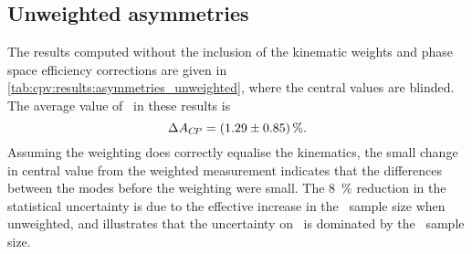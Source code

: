 \subsection{Unweighted asymmetries}

The results computed without the inclusion of the kinematic weights and phase 
space efficiency corrections are given in 
\cref{tab:cpv:results:asymmetries_unweighted}, where the central values are 
blinded.
The average value of \dACP\ in these results is
\begin{equation*}
  \dACP = \deltaACPUnweighted.
\end{equation*}
Assuming the weighting does correctly equalise the kinematics, the small change 
in central value from the weighted measurement indicates that the differences 
between the modes before the weighting were small.
The \SI{8}{\percent} reduction in the statistical uncertainty is due to the 
effective increase in the \ppipi\ sample size when unweighted, and illustrates 
that the uncertainty on \dACP\ is dominated by the \pKK\ sample size.

\begin{table}
  \centering
  \caption{%
    Measured asymmetries, in percent, for each data sub-sample and combination 
    of sub-samples.
    The computation of the combinations, ``2011 + 2012'' and ``Average'', is 
    defined in \cref{chap:cpv:results:combination}.
    The central values of all measurements are blinded.
  }
  \label{tab:cpv:results:asymmetries}
  
\end{table}

\begin{table}
  \centering
  \caption{%
    Measured asymmetries, in percent, for each data sub-sample and combination 
    of sub-samples without the inclusion of the kinematic weights and phase 
    space efficiency correction.
    The computation of the combinations, ``2011 + 2012'' and ``Average'', is 
    defined in \cref{chap:cpv:results:combination}.
    The central values of all measurements are blinded.
  }
  \label{tab:cpv:results:asymmetries_unweighted}
  
\end{table}

